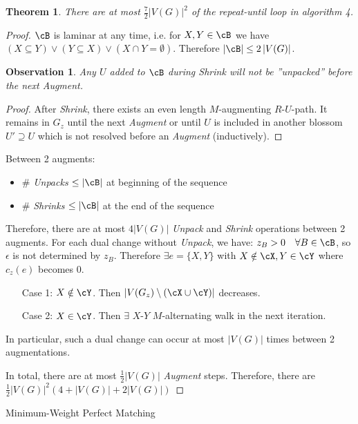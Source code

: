 \documentclass[11pt, a4paper]{article}
\newcommand{\abs}[1]{\left\lvert#1\right\rvert}
\newcommand{\set}[1]{\{#1\}}
\newtheorem{theorem}{Theorem}[section]
\newtheorem*{observation}{Observation}
\theoremstyle{remark}
\theoremstyle{definition}
\begin{document}
\begin{theorem}\label{thm:min-weight-matching-it}
	There are at most $\frac{7}{2}\abs{V(G)}^2$ of the repeat-until loop
	in algorithm 4.
\end{theorem}
\begin{proof}
	$\cB$ is laminar at any time, i.e. for $X,Y\in\cB$ we have
	$(X\subseteq Y)\lor (Y\subseteq X)\lor (X\cap Y=\emptyset)$. Therefore
	$\abs{\cB}\leq 2\abs{V(G)}$.
	\begin{observation}
		Any $U$ added to $\cB$ during \emph{Shrink} will not be ''unpacked'' before
		the next \emph{Augment}.
	\end{observation}
	\begin{proof}
		After \emph{Shrink}, there exists an even length $M$-augmenting $R$-$U$-path.
		It remains in $G_z$ until the next \emph{Augment} or until $U$ is included
		in another blossom $U'\supseteq U$ which is not resolved before an
		\emph{Augment} (inductively).
	\end{proof}

	Between 2 augments:
	\begin{itemize}
		\item $\#$ \emph{Unpacks} $\leq \abs{\cB}$ at beginning of the sequence
		\item $\#$ \emph{Shrinks} $\leq \abs{\cB}$ at the end of the sequence
	\end{itemize}
	Therefore, there are at most $4\abs{V(G)}$ \emph{Unpack} and \emph{Shrink} operations
	between 2 augments. For each dual change without \emph{Unpack}, we have:
	$z_B>0\quad \forall B\in\cB$, so $\epsilon$ is not determined by $z_B$.
	Therefore $\exists e=\set{X,Y}$ with $X\notin\cX, Y\in\cY$ where
	$c_z(e)$ becomes 0.
	\begin{enumerate}
		\item[Case 1:] $X\notin\cY$. Then $\abs{V(G_z)\setminus(\cX\cup\cY)}$
		decreases.
		\item[Case 2:] $X\in\cY$. Then $\exists$ $X$-$Y$ $M$-alternating walk in
		the next iteration.
	\end{enumerate}
	In particular, such a dual change can occur at most $\abs{V(G)}$ times
	between 2 augmentations.

	In total, there are at most $\frac{1}{2}\abs{V(G)}$ \emph{Augment}
	steps. Therefore, there are
	$\frac{1}{2}\abs{V(G)}^2(4+\abs{V(G)}+2\abs{V(G)})$
\end{proof}

\begin{algorithm}
	\caption{Minimum-Weight Perfect Matching}

\end{algorithm}
\end{document}
